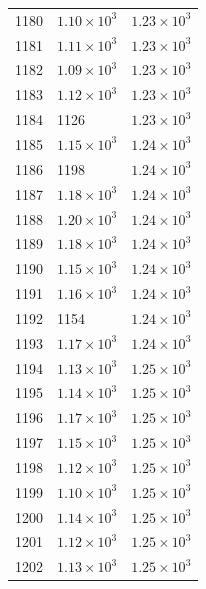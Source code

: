 \begin{table}[H]
\begin{tabular}{lll}
1180 & $\displaystyle 1.10 \times 10^{3}$ & $\displaystyle 1.23 \times 10^{3}$ \\
1181 & $\displaystyle 1.11 \times 10^{3}$ & $\displaystyle 1.23 \times 10^{3}$ \\
1182 & $\displaystyle 1.09 \times 10^{3}$ & $\displaystyle 1.23 \times 10^{3}$ \\
1183 & $\displaystyle 1.12 \times 10^{3}$ & $\displaystyle 1.23 \times 10^{3}$ \\
1184 & 1126 & $\displaystyle 1.23 \times 10^{3}$ \\
1185 & $\displaystyle 1.15 \times 10^{3}$ & $\displaystyle 1.24 \times 10^{3}$ \\
1186 & 1198 & $\displaystyle 1.24 \times 10^{3}$ \\
1187 & $\displaystyle 1.18 \times 10^{3}$ & $\displaystyle 1.24 \times 10^{3}$ \\
1188 & $\displaystyle 1.20 \times 10^{3}$ & $\displaystyle 1.24 \times 10^{3}$ \\
1189 & $\displaystyle 1.18 \times 10^{3}$ & $\displaystyle 1.24 \times 10^{3}$ \\
1190 & $\displaystyle 1.15 \times 10^{3}$ & $\displaystyle 1.24 \times 10^{3}$ \\
1191 & $\displaystyle 1.16 \times 10^{3}$ & $\displaystyle 1.24 \times 10^{3}$ \\
1192 & 1154 & $\displaystyle 1.24 \times 10^{3}$ \\
1193 & $\displaystyle 1.17 \times 10^{3}$ & $\displaystyle 1.24 \times 10^{3}$ \\
1194 & $\displaystyle 1.13 \times 10^{3}$ & $\displaystyle 1.25 \times 10^{3}$ \\
1195 & $\displaystyle 1.14 \times 10^{3}$ & $\displaystyle 1.25 \times 10^{3}$ \\
1196 & $\displaystyle 1.17 \times 10^{3}$ & $\displaystyle 1.25 \times 10^{3}$ \\
1197 & $\displaystyle 1.15 \times 10^{3}$ & $\displaystyle 1.25 \times 10^{3}$ \\
1198 & $\displaystyle 1.12 \times 10^{3}$ & $\displaystyle 1.25 \times 10^{3}$ \\
1199 & $\displaystyle 1.10 \times 10^{3}$ & $\displaystyle 1.25 \times 10^{3}$ \\
1200 & $\displaystyle 1.14 \times 10^{3}$ & $\displaystyle 1.25 \times 10^{3}$ \\
1201 & $\displaystyle 1.12 \times 10^{3}$ & $\displaystyle 1.25 \times 10^{3}$ \\
1202 & $\displaystyle 1.13 \times 10^{3}$ & $\displaystyle 1.25 \times 10^{3}$ \\

\end{tabular}
\end{table}
